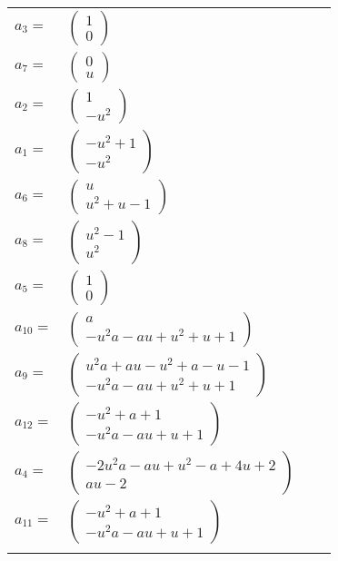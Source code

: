 \documentclass[1p]{elsarticle_modified}
\theoremstyle{definition}
\begin{document}
\begin{tabular}{m{7pt} m{180pt} m{7pt} m{180pt} }
\flushright $a_{3}=$&$\begin{pmatrix}1\\0\end{pmatrix}$ \\
\flushright $a_{7}=$&$\begin{pmatrix}0\\u\end{pmatrix}$ \\
\flushright $a_{2}=$&$\begin{pmatrix}1\\- u^2\end{pmatrix}$ \\
\flushright $a_{1}=$&$\begin{pmatrix}- u^2+1\\- u^2\end{pmatrix}$ \\
\flushright $a_{6}=$&$\begin{pmatrix}u\\u^2+u-1\end{pmatrix}$ \\
\flushright $a_{8}=$&$\begin{pmatrix}u^2-1\\u^2\end{pmatrix}$ \\
\flushright $a_{5}=$&$\begin{pmatrix}1\\0\end{pmatrix}$ \\
\flushright $a_{10}=$&$\begin{pmatrix}a\\- u^2 a- a u+u^2+u+1\end{pmatrix}$ \\
\flushright $a_{9}=$&$\begin{pmatrix}u^2 a+a u- u^2+a- u-1\\- u^2 a- a u+u^2+u+1\end{pmatrix}$ \\
\flushright $a_{12}=$&$\begin{pmatrix}- u^2+a+1\\- u^2 a- a u+u+1\end{pmatrix}$ \\
\flushright $a_{4}=$&$\begin{pmatrix}-2 u^2 a- a u+u^2- a+4 u+2\\a u-2\end{pmatrix}$ \\
\flushright $a_{11}=$&$\begin{pmatrix}- u^2+a+1\\- u^2 a- a u+u+1\end{pmatrix}$\\&\end{tabular}
\end{document}
